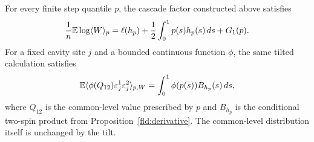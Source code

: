 \begin{proposition}\label{cav:evaluation}
For every finite step quantile $p$, the cascade factor constructed above
satisfies
\begin{equation}\label{cav:evaluated}
 \frac1n\mathbb E\log\langle W\rangle_p
 =\ell(h_p)+\frac12\int_0^1p(s)h_p(s)\,ds+G_1(p).
\end{equation}
For a fixed cavity site $j$ and a bounded continuous function $\phi$,
the same tilted calculation satisfies
\begin{equation}\label{cav:spin-test}
 \mathbb E\langle\phi(Q_{12})\varepsilon_j^1\varepsilon_j^2\rangle_{p,W}
 =\int_0^1\phi(p(s))B_{h_p}(s)\,ds,
\end{equation}
where $Q_{12}$ is the common-level value prescribed by $p$ and
$B_{h_p}$ is the conditional two-spin product from
Proposition~\ref{fld:derivative}.  The common-level distribution itself
is unchanged by the tilt.
\end{proposition}

